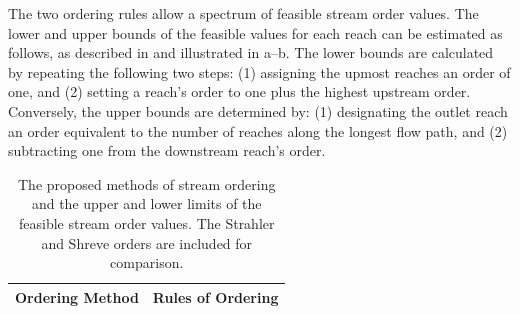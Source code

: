 \documentclass[water,article,submit,pdftex,moreauthors]{Definitions/mdpi}
\begin{document}
The two ordering rules allow a spectrum of feasible stream order values. The lower and upper bounds of the feasible values for each reach can be estimated as follows, as described in  and illustrated in a--b. The lower bounds are calculated by repeating the following two steps: (1) assigning the upmost reaches an order of one, and (2) setting a reach's order to one plus the highest upstream order. Conversely, the upper bounds are determined by: (1) designating the outlet reach an order equivalent to the number of reaches along the longest flow path, and (2) subtracting one from the downstream reach's order.

\begin{table}[H]
    \caption{The proposed methods of stream ordering and the upper and lower limits of the feasible stream order values. The Strahler and Shreve orders are included for comparison.\label{tab:zheng_order}}
    \begin{tabularx}{\textwidth}{c C}
        \toprule
        \textbf{Ordering Method}                   & \textbf{Rules of Ordering}
        \\
        \midrule


\end{tabularx}
\end{table}
\end{document}
